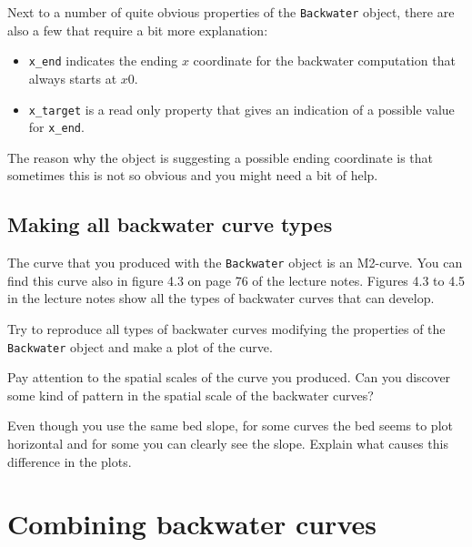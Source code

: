 \documentclass[a4paper]{article}
\begin{document}
Next to a number of quite obvious properties of the \lstinline{Backwater} object, there are also a few that require a bit more explanation:
\begin{itemize}
  \item \lstinline{x_end} indicates the ending $x$ coordinate for the backwater computation that always starts at $x0$. 
  \item \lstinline{x_target} is a read only property that gives an indication of a possible value for \lstinline{x_end}. 
\end{itemize}
The reason why the object is suggesting a possible ending coordinate is that sometimes this is not so obvious and you might need a bit of help.

\subsection{Making all backwater curve types}
The curve that you produced with the \lstinline{Backwater} object is an M2-curve. You can find this curve also in figure 4.3 on page 76 of the lecture notes. Figures 4.3 to 4.5 in the lecture notes show all the types of backwater curves that can develop.

\begin{exercise}
  Try to reproduce all types of backwater curves modifying the properties of the \lstinline{Backwater} object and make a plot of the curve. 
\end{exercise}

\begin{exercise}
  Pay attention to the spatial scales of the curve you produced. Can you discover some kind of pattern in the spatial scale of the backwater curves?
\end{exercise}

\begin{exercise}
  Even though you use the same bed slope, for some curves the bed seems to plot horizontal and for some you can clearly see the slope. Explain what causes this difference in the plots.
\end{exercise}

\section{Combining backwater curves}
\end{document}
